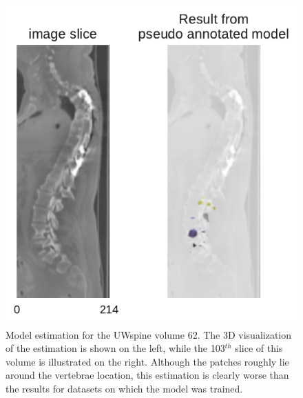 \begin{figure}
\begin{minipage}{.45\textwidth}
        \includegraphics[width=.99\textwidth]{images/fullvsPseudo_UW_062_103.pdf}
    \end{minipage} 
    \caption{Model estimation for the UWspine volume 62. The 3D visualization of the estimation is shown on the left, while the 103$^{th}$ slice of this volume is illustrated on the right.
    Although the patches roughly lie around the vertebrae location, this estimation is clearly worse than the results for datasets on which the model was trained.
    \protect
    }
\end{figure}